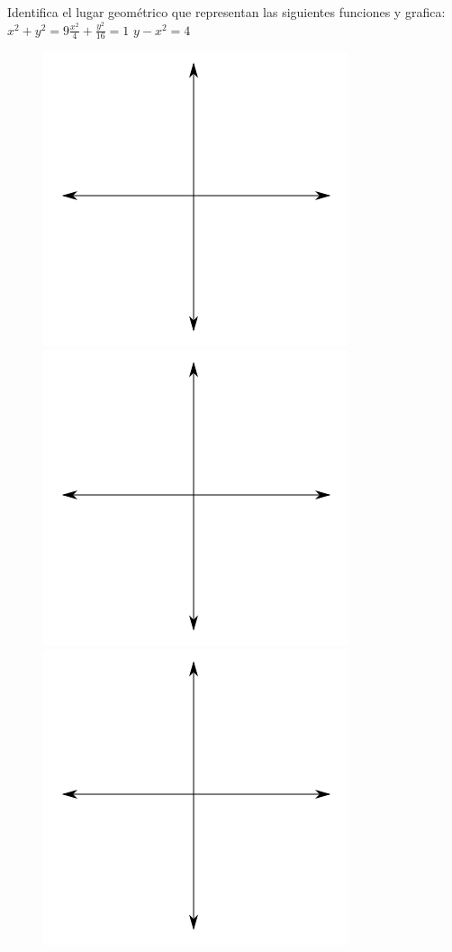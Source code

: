 \documentclass[a4paper,10pt]{article}
\begin{document}
Identifica el lugar geométrico que representan las siguientes funciones y grafica:
\vspace{0.4cm}\\
$x^2+y^2=9$\hspace{3cm}$\frac{x^2}{4}+\frac{y^2}{16}=1$\hspace{3cm} $y-x^2=4$

\begin{figure}[H]
\includegraphics[scale=0.33]{plot.png}
\includegraphics[scale=0.33]{plot.png}
\includegraphics[scale=0.33]{plot.png}
\end{figure}
\vspace{0.5cm}\\
\end{document}
